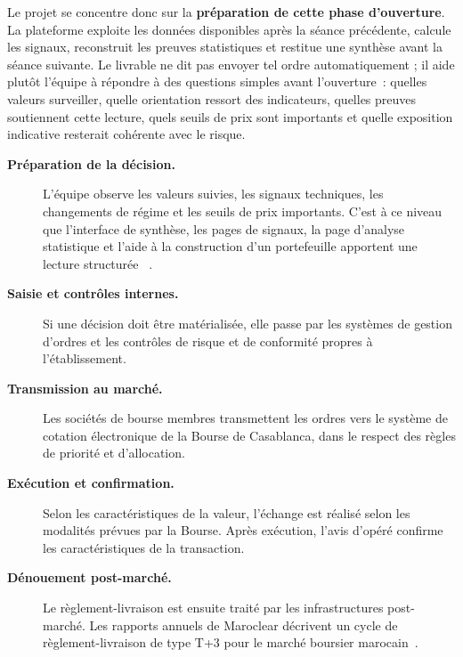 Le projet se concentre donc sur la \textbf{préparation de cette phase d'ouverture}.
La plateforme exploite les données disponibles après la séance précédente, calcule les
signaux, reconstruit les preuves statistiques et restitue une synthèse avant la séance
suivante. Le livrable ne dit pas \og envoyer tel ordre automatiquement \fg{}; il aide
plutôt l'équipe à répondre à des questions simples avant l'ouverture~: quelles valeurs
surveiller, quelle orientation ressort des indicateurs, quelles preuves soutiennent cette
lecture, quels seuils de prix sont importants et quelle exposition indicative resterait
cohérente avec le risque.

\begin{description}
    \item[\textbf{Préparation de la décision.}]
    L'équipe observe les valeurs suivies, les signaux techniques, les changements de
    régime et les seuils de prix importants. C'est à ce niveau que l'interface de
    synthèse, les pages de signaux, la page d'analyse statistique et l'aide à la
    construction d'un portefeuille apportent une lecture structurée
    ~\cite{repo_app_map,repo_dashboard_docs,repo_analytics_docs}.

    \item[\textbf{Saisie et contrôles internes.}]
    Si une décision doit être matérialisée, elle passe par les systèmes de gestion
    d'ordres et les contrôles de risque et de conformité propres à l'établissement.

    \item[\textbf{Transmission au marché.}]
    Les sociétés de bourse membres transmettent les ordres vers le système de cotation
    électronique de la Bourse de Casablanca, dans le respect des règles de priorité et
    d'allocation.

    \item[\textbf{Exécution et confirmation.}]
    Selon les caractéristiques de la valeur, l'échange est réalisé selon les modalités
    prévues par la Bourse. Après exécution, l'avis d'opéré confirme les caractéristiques
    de la transaction.

    \item[\textbf{Dénouement post-marché.}]
    Le règlement-livraison est ensuite traité par les infrastructures post-marché. Les
    rapports annuels de Maroclear décrivent un cycle de règlement-livraison de type
    T+3 pour le marché boursier marocain~\cite{maroclear_annual_report_2018}.
\end{description}

